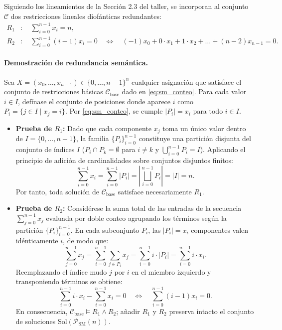 Siguiendo los lineamientos de la Sección 2.3 del taller, se incorporan al conjunto $\mathcal{C}$ dos restricciones lineales diofánticas redundantes:
\begin{align}
    R_1 &: \quad \sum_{i=0}^{n-1} x_i = n, \label{eq:sm_r1} \\
    R_2 &: \quad \sum_{i=0}^{n-1} (i - 1) x_i = 0 \quad \Longleftrightarrow \quad (-1)x_0 + 0\cdot x_1 + 1\cdot x_2 + \dots + (n-2)x_{n-1} = 0. \label{eq:sm_r2}
\end{align}

\paragraph{Demostración de redundancia semántica.}
Sea $X = (x_0, \dots, x_{n-1}) \in \{0, \dots, n-1\}^n$ cualquier asignación que satisface el conjunto de restricciones básicas $\mathcal{C}_{\text{base}}$ dado en \eqref{eq:sm_conteo}. Para cada valor $i \in I$, defínase el conjunto de posiciones donde aparece $i$ como $P_i = \{j \in I \mid x_j = i\}$. Por \eqref{eq:sm_conteo}, se cumple $|P_i| = x_i$ para todo $i \in I$.
\begin{itemize}
    \item \textbf{Prueba de $R_1$:} Dado que cada componente $x_j$ toma un único valor dentro de $I = \{0, \dots, n-1\}$, la familia $\{P_i\}_{i=0}^{n-1}$ constituye una partición disjunta del conjunto de índices $I$ ($P_i \cap P_k = \emptyset$ para $i \neq k$ y $\bigcup_{i=0}^{n-1} P_i = I$). Aplicando el principio de adición de cardinalidades sobre conjuntos disjuntos finitos:
    \[
        \sum_{i=0}^{n-1} x_i = \sum_{i=0}^{n-1} |P_i| = \left| \bigsqcup_{i=0}^{n-1} P_i \right| = |I| = n.
    \]
    Por tanto, toda solución de $\mathcal{C}_{\text{base}}$ satisface necesariamente $R_1$.
    \item \textbf{Prueba de $R_2$:} Considérese la suma total de las entradas de la secuencia $\sum_{j=0}^{n-1} x_j$ evaluada por doble conteo agrupando los términos según la partición $\{P_i\}_{i=0}^{n-1}$. En cada subconjunto $P_i$, las $|P_i| = x_i$ componentes valen idénticamente $i$, de modo que:
    \[
        \sum_{j=0}^{n-1} x_j = \sum_{i=0}^{n-1} \sum_{j \in P_i} x_j = \sum_{i=0}^{n-1} i \cdot |P_i| = \sum_{i=0}^{n-1} i \cdot x_i.
    \]
    Reemplazando el índice mudo $j$ por $i$ en el miembro izquierdo y transponiendo términos se obtiene:
    \[
        \sum_{i=0}^{n-1} i \cdot x_i - \sum_{i=0}^{n-1} x_i = 0 \quad \Longleftrightarrow \quad \sum_{i=0}^{n-1} (i - 1) x_i = 0.
    \]
    En consecuencia, $\mathcal{C}_{\text{base}} \models R_1 \land R_2$; añadir $R_1$ y $R_2$ preserva intacto el conjunto de soluciones $\text{Sol}(\mathcal{P}_{\text{SM}}(n))$.
\end{itemize}

